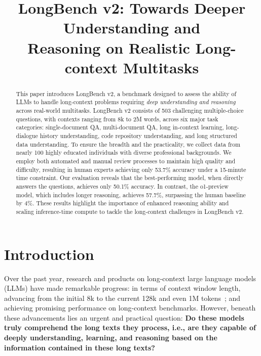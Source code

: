 \title{LongBench v2: Towards Deeper Understanding and\\ Reasoning on Realistic Long-context Multitasks}



\maketitle

\begin{abstract}

This paper introduces LongBench v2, a benchmark designed to assess the ability of LLMs to handle long-context problems requiring \emph{deep understanding and reasoning} across real-world multitasks. LongBench v2 consists of 503 challenging multiple-choice questions, with contexts ranging from 8k to 2M words, across six major task categories: single-document QA, multi-document QA, long in-context learning, long-dialogue history understanding, code repository understanding, and long structured data understanding.
To ensure the breadth and the practicality, we collect data from nearly 100 highly educated individuals with diverse professional backgrounds. We employ both automated and manual review processes to maintain high quality and difficulty, resulting in human experts achieving only 53.7\% accuracy under a 15-minute time constraint.
Our evaluation reveals that the best-performing model, when directly answers the questions, achieves only 50.1\% accuracy. In contrast, the o1-preview model, which includes longer reasoning, achieves 57.7\%, surpassing the human baseline by 4\%. 
These results highlight the importance of enhanced reasoning ability and scaling inference-time compute to tackle the long-context challenges in LongBench v2.

\end{abstract}
\section{Introduction}

Over the past year, research and products on long-context large language models (LLMs) have made remarkable progress: in terms of context window length, advancing from the initial 8k to the current 128k and even 1M tokens~\cite{GPT-4o,claude-3-5,reid2024gemini,glm2024chatglm}; and achieving promising performance on long-context benchmarks. However, beneath these advancements lies an urgent and practical question: \textbf{Do these models truly comprehend the long texts they process, i.e., are they capable of deeply understanding, learning, and reasoning based on the information contained in these long texts?}

